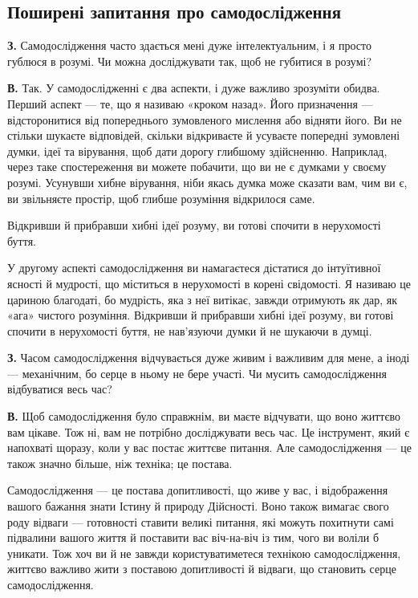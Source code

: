 \subsection*{Поширені запитання про самодослідження}

\textbf{З.} Самодослідження часто здається мені дуже інтелектуальним, і я просто гублюся в розумі. Чи можна досліджувати так, щоб не губитися в розумі?

\textbf{В.} Так. У самодослідженні є два аспекти, і дуже важливо зрозуміти обидва. Перший аспект — те, що я називаю «кроком назад». Його призначення — відсторонитися від попереднього зумовленого мислення або відняти його. Ви не стільки шукаєте відповідей, скільки відкриваєте й усуваєте попередні зумовлені думки, ідеї та вірування, щоб дати дорогу глибшому здійсненню. Наприклад, через таке спостереження ви можете побачити, що ви не є думками у своєму розумі. Усунувши хибне вірування, ніби якась думка може сказати вам, чим ви є, ви звільняєте простір, щоб глибше розуміння відкрилося саме.

Відкривши й прибравши хибні ідеї розуму, ви готові спочити в нерухомості буття.

У другому аспекті самодослідження ви намагаєтеся дістатися до інтуїтивної ясності й мудрості, що міститься в нерухомості в корені свідомості. Я називаю це цариною благодаті, бо мудрість, яка з неї витікає, завжди отримують як дар, як «ага» чистого розуміння. Відкривши й прибравши хибні ідеї розуму, ви готові спочити в нерухомості буття, не нав'язуючи думки й не шукаючи в думці.

\textbf{З.} Часом самодослідження відчувається дуже живим і важливим для мене, а іноді — механічним, бо серце в ньому не бере участі. Чи мусить самодослідження відбуватися весь час?

\textbf{В.} Щоб самодослідження було справжнім, ви маєте відчувати, що воно життєво вам цікаве. Тож ні, вам не потрібно досліджувати весь час. Це інструмент, який є напохваті щоразу, коли у вас постає життєве питання. Але самодослідження — це також значно більше, ніж техніка; це постава.

Самодослідження — це постава допитливості, що живе у вас, і відображення вашого бажання знати Істину й природу Дійсності. Воно також вимагає свого роду відваги — готовності ставити великі питання, які можуть похитнути самі підвалини вашого життя й поставити вас віч-на-віч із тим, чого ви воліли б уникати. Тож хоч ви й не завжди користуватиметеся технікою самодослідження, життєво важливо жити з поставою допитливості й відваги, що становить серце самодослідження.

